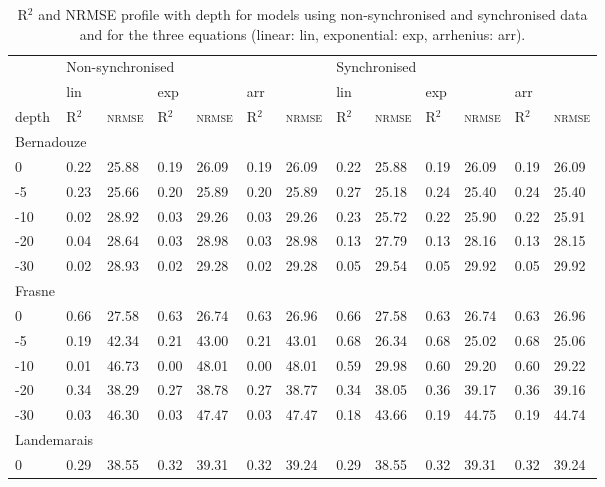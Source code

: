\begin{table}
\centering
\caption{R$^{2}$ and NRMSE profile with depth for models using non-synchronised and synchronised data and for the three equations (linear: lin, exponential: exp, arrhenius: arr).}
\hspace*{-1cm}
\begin{tabular}{lllllllllllll}
\hline
& \multicolumn{6}{l}{Non-synchronised} & \multicolumn{6}{l}{Synchronised} \\
 & lin &  & exp &  & arr & & lin &  & exp &  & arr &  \\[-.5ex] 
depth & R$^{2}$ & \textsc{nrmse} & R$^{2}$ & \textsc{nrmse} & R$^{2}$ & \textsc{nrmse} & R$^{2}$ & \textsc{nrmse} & R$^{2}$ & \textsc{nrmse} & R$^{2}$ & \textsc{nrmse} \\ 
\hline
\multicolumn{2}{l}{Bernadouze} & & & & & & & & & & & \\[-.5ex]
0 & 0.22 & 25.88 & 0.19 & 26.09 & 0.19 & 26.09 & 0.22 & 25.88 & 0.19 & 26.09 & 0.19 & 26.09\\
-5 & 0.23 & 25.66 & 0.20 & 25.89 & 0.20 & 25.89 & 0.27 & 25.18 & 0.24 & 25.40 & 0.24 & 25.40\\
-10 & 0.02 & 28.92 & 0.03 & 29.26 & 0.03 & 29.26 & 0.23 & 25.72 & 0.22 & 25.90 & 0.22 & 25.91\\
-20 & 0.04 & 28.64 & 0.03 & 28.98 & 0.03 & 28.98 & 0.13 & 27.79 & 0.13 & 28.16 & 0.13 & 28.15\\
-30 & 0.02 & 28.93 & 0.02 & 29.28 & 0.02 & 29.28 & 0.05 & 29.54 & 0.05 & 29.92 & 0.05 & 29.92\\
\multicolumn{2}{l}{Frasne} & & & & & & & & & & & \\[-.5ex]
0 & 0.66 & 27.58 & 0.63 & 26.74 & 0.63 & 26.96 & 0.66 & 27.58 & 0.63 & 26.74 & 0.63 & 26.96\\
-5 & 0.19 & 42.34 & 0.21 & 43.00 & 0.21 & 43.01 & 0.68 & 26.34 & 0.68 & 25.02 & 0.68 & 25.06\\
-10 & 0.01 & 46.73 & 0.00 & 48.01 & 0.00 & 48.01 & 0.59 & 29.98 & 0.60 & 29.20 & 0.60 & 29.22\\
-20 & 0.34 & 38.29 & 0.27 & 38.78 & 0.27 & 38.77 & 0.34 & 38.05 & 0.36 & 39.17 & 0.36 & 39.16\\
-30 & 0.03 & 46.30 & 0.03 & 47.47 & 0.03 & 47.47 & 0.18 & 43.66 & 0.19 & 44.75 & 0.19 & 44.74\\
\multicolumn{2}{l}{Landemarais} & & & & & & & & & & & \\[-.5ex]
0 & 0.29 & 38.55 & 0.32 & 39.31 & 0.32 & 39.24 & 0.29 & 38.55 & 0.32 & 39.31 & 0.32 & 39.24\\

\end{tabular}
\end{table}
